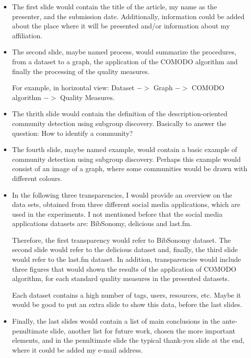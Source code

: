 \documentclass[a4paper]{article}
\begin{document}
\begin{itemize}
	\item The first slide would contain the title of the article, my name as the presenter, and the submission date. Additionally, information could be added about the place where it will be presented and/or information about my affiliation.
	
	\item The second slide, maybe named process, would summarize the procedures, from a dataset to a graph, the application of the COMODO algorithm and finally the processing of the quality measures. 
	
	For example, in horizontal view: Dataset  $->$ Graph $->$ COMODO algorithm $->$ Quality Measures.
	
	\item The thrith slide would contain the definition of the description-oriented community detection using subgroup discovery. Basically to answer the question: How to identify a community?
	
	\item The fourth slide, maybe named example, would contain a basic example of community detection using subgroup discovery. Perhaps this example would consist of an image of a graph, where some communities would be drawn with different colours.
	
	\item In the following three transparencies, I would provide an overview on the data sets, obtained from three different social media applications, which are used in the experiments. I not mentioned before that the social media applications datasets are: BibSonomy, delicious and last.fm.
	
	Therefore, the first transparency would refer to BibSonomy dataset. The second slide would refer to the delicious dataset and, finally, the third slide would refer to the last.fm dataset. In addition, transparencies would include three figures that would shown the results of the application of COMODO algorithm, for each standard quality measures in the presented datasets. 
		
	Each dataset contains a high number of tags, users, resources, etc. Maybe it would be good to put an extra slide to show this data, before the last slides.
	
	\item Finally, the last slides would contain a list of main conclusions in the ante-penultimate slide, another list for future work, chosen the more important elements, and in the penultimate slide the typical thank-you slide at the end, where it could be added my e-mail address.
\end{itemize}
\end{document}
